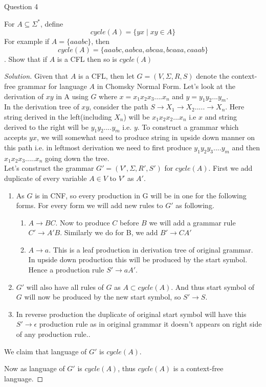 \begin{solution}{Question 4}\label{ques:4}
    \begin{question}
    For $A \subseteq \Sigma^*$, define 
$$cycle(A) = \{yx \mid xy \in A\}$$
For example if $A = \{aaabc\}$, then 
$$cycle(A) = \{aaabc, aabca, abcaa, bcaaa, caaab\}$$.
Show that if $A$ is a CFL then so is $cycle(A)$
    \end{question}
    \tcblower{}
    \begin{proof}[Solution]
    Given that $A$ is a CFL, then let $G = (V, \Sigma, R, S)$ denote the context-free grammar for language $A$ in Chomsky Normal Form. Let's look at the derivation of $xy$ in A using $G$ where $x = x_1x_2x_3....x_n$ and $y = y_1y_2...y_m$.\\
    
    In the derivation tree of $xy$, consider the path $S \longrightarrow X_1 \longrightarrow X_2 ..... \longrightarrow X_n$. Here string derived in the left(including $X_n$) will be $x_1x_2x_2...x_n$ i.e $x$ and string derived to the right will be $y_1y_2....y_m$ i.e. $y$. To construct a grammar which accepts $yx$, we will somewhat need to produce string in upside down manner on this path i.e. in leftmost derivation we need to first produce $y_1y_2y_3....y_m$ and then $x_1x_2x_3.....x_n$ going down the tree.\\
    
    Let's construct the grammar  $G' = (V', \Sigma, R', S')$ for $cycle(A)$. First we add duplicate of every variable $A \in V$ to $V'$ as $A'$.
    \begin{enumerate}
        \item As $G$ is in CNF, so every production in G will be in one for the following forms. For every form we will add new rules to $G'$ as following.
            \begin{enumerate}
                \item $A \longrightarrow BC$. Now to produce $C$ before $B$ we will add a grammar rule $C' \longrightarrow A'B$. Similarly we do for B, we add $B' \longrightarrow CA'$
                \item $A \longrightarrow a$. This is a leaf production in derivation tree of original grammar. In upside down production this will be produced by the start symbol. Hence a production rule $S' \longrightarrow aA'$.
            \end{enumerate}
        \item $G'$ will also have all rules of $G$ as $A \subset cycle(A)$. And thus start symbol of $G$ will now be produced by the new start symbol, so $S' \longrightarrow S$.
        \item In reverse production the duplicate of original start symbol will have this $S' \longrightarrow \epsilon$ production rule as in original grammar it doesn't appears on right side of any production rule..
    \end{enumerate}
    
    We claim that language of $G'$ is $cycle(A)$. 
    
    Now as language of $G'$ is $cycle(A)$, thus $cycle(A)$ is a context-free language. 
    \end{proof}
\end{solution}
